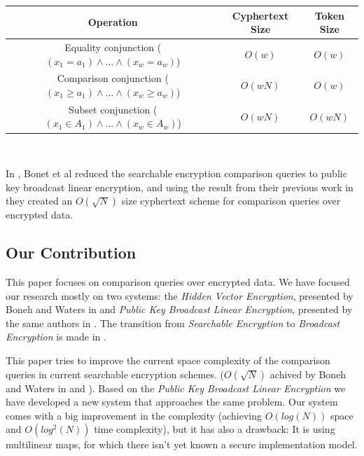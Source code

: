 \documentclass[a4paper, 12pt, oneside]{article}
\begin{document}
\begin{center}
 \begin{tabular}{|c|c|c|} 
 \hline
  Operation & Cyphertext Size & Token Size \\ [0.5ex] 
 \hline\hline
 Equality conjunction ($(x_1 = a_1) \wedge ... \wedge (x_w = a_w)$) & $O(w)$ & $O(w)$ \\ 
 \hline
Comparison conjunction ($(x_1 \geq a_1) \wedge ... \wedge (x_w \geq a_w)$) & $O(wN)$ & $O(w)$ \\ 
 \hline
 Subset conjunction ($(x_1 \in A_1) \wedge ... \wedge (x_w \in A_w)$) & $O(wN)$ & $O(wN)$ \\ 
 \hline
\end{tabular}
\\
\end{center}

	
\bigskip

In \cite{bowa}, Bonet et al reduced the searchable encryption comparison queries to public key broadcast linear encryption, and using the result from their previous work in \cite{traitor} they created an $O(\sqrt{N})$ size cyphertext scheme for comparison queries over encrypted data.
	


\subsection{Our Contribution}

This paper focuses on comparison queries over encrypted data. We have focused our research mostly on two systems: the \textit{Hidden Vector Encryption}, presented by Boneh and Waters in \cite{bowa} and \textit{Public Key Broadcast Linear Encryption}, presented by the same authors in \cite{traitor}. The transition from \textit{Searchable Encryption} to \textit{Broadcast Encryption} is made in \cite{bowa}.

\bigskip
This paper tries to improve the current space complexity of the comparison queries in current searchable encryption schemes. ($O(\sqrt{N})$ achived by Boneh and Waters in \cite{bowa} and \cite{traitor}).
Based on the \textit{Public Key Broadcast Linear Encryption} we have developed a new system that approaches the same problem. Our system comes with a big improvement in the complexity (achieving $O(log(N))$ space and $O(log^2(N))$ time complexity), but it has also a drawback: It is using multilinear maps, for which there isn't yet known a secure implementation model.
\end{document}
